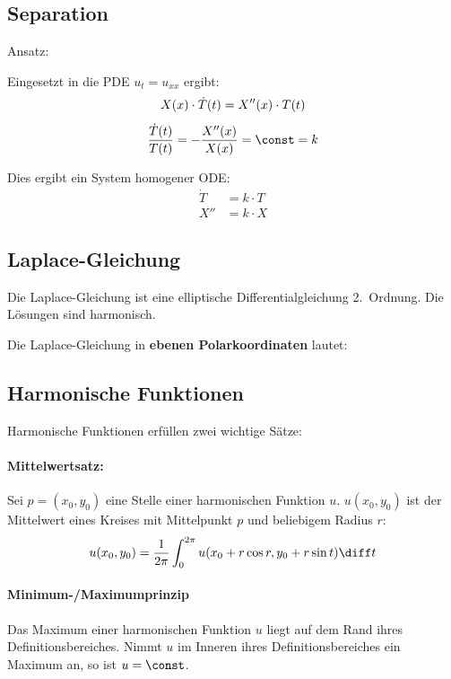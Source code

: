 	\subsection{Separation} %
		Ansatz:
		
		Eingesetzt in die PDE $u_t = u_{xx}$ ergibt:
		\begin{gather*}
			X(x) \cdot \dot T(t) = X''(x) \cdot T(t) \\[1ex]
			\frac{\dot T(t)}{T(t)} = -\frac{X''(x)}{X(x)} = \const = k
		\end{gather*}
		
		Dies ergibt ein System homogener ODE:
		\begin{align*}
			\dot T &= k\cdot T \\
			X'' &= k \cdot X
		\end{align*}
	\subsection{Laplace-Gleichung} %
		Die Laplace-Gleichung
		ist eine elliptische Differentialgleichung 2.~Ordnung.
		Die Lösungen sind harmonisch.
		
		Die Laplace-Gleichung in \textbf{ebenen Polarkoordinaten} lautet:
	\subsection{Harmonische Funktionen} %
		Harmonische Funktionen erfüllen zwei wichtige Sätze:
		
		\paragraph{Mittelwertsatz:} %
			Sei $p = (x_0,y_0)$ eine Stelle einer harmonischen Funktion $u$.
			$u(x_0,y_0)$ ist der Mittelwert eines Kreises mit Mittelpunkt $p$ und
			beliebigem Radius $r$:
			\[
				u(x_0, y_0) = \frac{1}{2\pi} \int_0^{2\pi} u(x_0 + r\cos r, y_0 + r\sin t) \diff t
			\]
		
		\paragraph{Minimum-/Maximumprinzip} %
			Das Maximum einer harmonischen Funktion $u$ liegt auf dem Rand ihres
			Definitionsbereiches. Nimmt $u$ im Inneren ihres Definitionsbereiches
			ein Maximum an, so ist $u = \const$.
